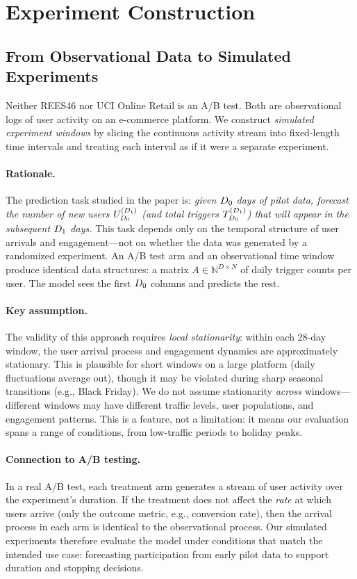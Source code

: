 \section{Experiment Construction}
\label{sec:experiment_construction}

\subsection{From Observational Data to Simulated Experiments}
\label{subsec:obs_to_exp}

Neither REES46 nor UCI Online Retail is an A/B test.
Both are observational logs of user activity on an e-commerce
platform.
We construct \emph{simulated experiment windows} by slicing
the continuous activity stream into fixed-length time intervals
and treating each interval as if it were a separate experiment.

\paragraph{Rationale.}
The prediction task studied in the paper is:
\emph{given $D_0$ days of pilot data, forecast the number
of new users $U_{D_0}^{(D_1)}$ (and total triggers $T_{D_0}^{(D_1)}$) that will
appear in the subsequent $D_1$ days.}
This task depends only on the temporal structure of user arrivals
and engagement---not on whether the data was generated by a
randomized experiment.
An A/B test arm and an observational time window produce
identical data structures: a matrix
$A \in \mathbb{N}^{D \times N}$ of daily trigger counts per user.
The model sees the first $D_0$ columns and predicts the rest.

\paragraph{Key assumption.}
The validity of this approach requires \emph{local stationarity}:
within each 28-day window, the user arrival process and
engagement dynamics are approximately stationary.
This is plausible for short windows on a large platform
(daily fluctuations average out), though it may be violated
during sharp seasonal transitions (e.g., Black Friday).
We do not assume stationarity \emph{across} windows---different
windows may have different traffic levels, user populations,
and engagement patterns.
This is a feature, not a limitation: it means our evaluation
spans a range of conditions, from low-traffic periods to
holiday peaks.

\paragraph{Connection to A/B testing.}
In a real A/B test, each treatment arm generates a stream of
user activity over the experiment's duration.
If the treatment does not affect the \emph{rate} at which users
arrive (only the outcome metric, e.g., conversion rate), then
the arrival process in each arm is identical to the observational
process.
Our simulated experiments therefore evaluate the model under
conditions that match the intended use case: forecasting
participation from early pilot data to support duration and
stopping decisions.

